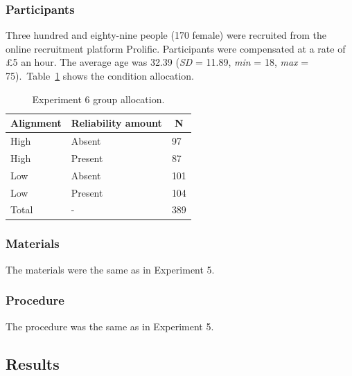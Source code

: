 \documentclass[a4paper, nobind, dvipsnames]{templates/ociamthesis}
\theoremstyle{definition}
\theoremstyle{definition}
\theoremstyle{definition}
\theoremstyle{definition}
\theoremstyle{remark}
\begin{document}
\subsubsection{Participants}

Three hundred and eighty-nine people (170 female) were recruited from the online recruitment platform Prolific. Participants were compensated at a rate of £5 an hour. The average age was 32.39 (\emph{SD} = 11.89, \emph{min} = 18, \emph{max} = 75).~Table~\ref{tab:condition-allocation-alignment-5}
shows the condition allocation.

\begin{table}[tbp]

\begin{center}
\begin{threeparttable}

\caption{\label{tab:condition-allocation-alignment-5}Experiment 6 group allocation.}

\begin{tabular}{lll}
\toprule
Alignment & \multicolumn{1}{c}{Reliability amount} & \multicolumn{1}{c}{N}\\
\midrule
High & Absent & 97\\
High & Present & 87\\
Low & Absent & 101\\
Low & Present & 104\\
Total & - & 389\\
\bottomrule
\end{tabular}

\end{threeparttable}
\end{center}

\end{table}

\subsubsection{Materials}

The materials were the same as in Experiment 5.

\subsubsection{Procedure}

The procedure was the same as in Experiment 5.

\subsection{Results}
\end{document}
